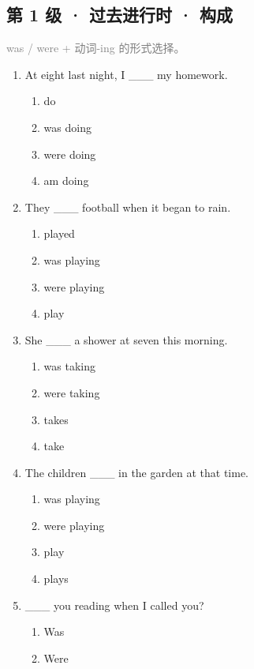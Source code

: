 \documentclass[11pt,a4paper]{ctexart}
\begin{document}
\subsection*{第 1 级 · 过去进行时 · 构成}
\noindent\textcolor{gray}{was / were + 动词-ing 的形式选择。}\par\smallskip
\begin{enumerate}[leftmargin=*,itemsep=4pt]
\item At eight last night, I \_\_\_ my homework.
\begin{enumerate}[label=\Alph*.,leftmargin=2em,itemsep=1pt,topsep=2pt]
\item do
\item was doing
\item were doing
\item am doing
\end{enumerate}
\item They \_\_\_ football when it began to rain.
\begin{enumerate}[label=\Alph*.,leftmargin=2em,itemsep=1pt,topsep=2pt]
\item played
\item was playing
\item were playing
\item play
\end{enumerate}
\item She \_\_\_ a shower at seven this morning.
\begin{enumerate}[label=\Alph*.,leftmargin=2em,itemsep=1pt,topsep=2pt]
\item was taking
\item were taking
\item takes
\item take
\end{enumerate}
\item The children \_\_\_ in the garden at that time.
\begin{enumerate}[label=\Alph*.,leftmargin=2em,itemsep=1pt,topsep=2pt]
\item was playing
\item were playing
\item play
\item plays
\end{enumerate}
\item \_\_\_ you reading when I called you?
\begin{enumerate}[label=\Alph*.,leftmargin=2em,itemsep=1pt,topsep=2pt]
\item Was
\item Were

\end{enumerate}
\end{enumerate}
\end{document}
